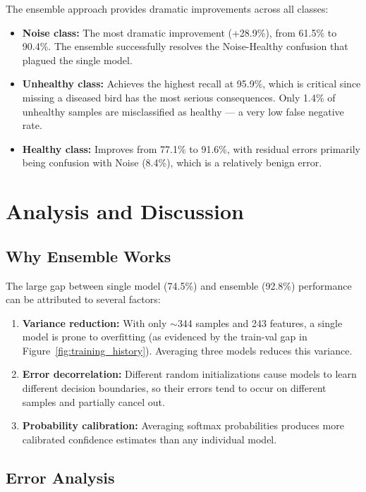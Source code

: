 \documentclass[12pt,a4paper]{report}
\begin{document}
The ensemble approach provides dramatic improvements across all classes:
\begin{itemize}
    \item \textbf{Noise class:} The most dramatic improvement (+28.9\%), from 61.5\% to 90.4\%. The ensemble successfully resolves the Noise-Healthy confusion that plagued the single model.
    \item \textbf{Unhealthy class:} Achieves the highest recall at 95.9\%, which is critical since missing a diseased bird has the most serious consequences. Only 1.4\% of unhealthy samples are misclassified as healthy --- a very low false negative rate.
    \item \textbf{Healthy class:} Improves from 77.1\% to 91.6\%, with residual errors primarily being confusion with Noise (8.4\%), which is a relatively benign error.
\end{itemize}


\section{Analysis and Discussion}

\subsection{Why Ensemble Works}

The large gap between single model (74.5\%) and ensemble (92.8\%) performance can be attributed to several factors:

\begin{enumerate}
    \item \textbf{Variance reduction:} With only $\sim$344 samples and 243 features, a single model is prone to overfitting (as evidenced by the train-val gap in Figure~\ref{fig:training_history}). Averaging three models reduces this variance.
    \item \textbf{Error decorrelation:} Different random initializations cause models to learn different decision boundaries, so their errors tend to occur on different samples and partially cancel out.
    \item \textbf{Probability calibration:} Averaging softmax probabilities produces more calibrated confidence estimates than any individual model.
\end{enumerate}

\subsection{Error Analysis}
\end{document}
